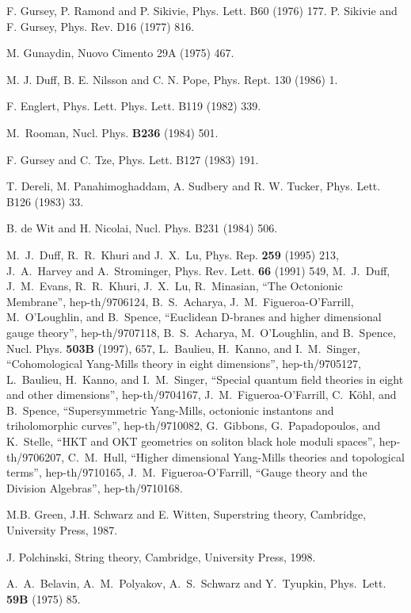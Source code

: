 \documentclass[a4paper,12pt]{book}
\begin{document}
\begin{thebibliography}{999}
  F. Gursey, P. Ramond and P. Sikivie, Phys. Lett. B60 (1976)
177. \newline
P. Sikivie and F. Gursey, Phys. Rev. D16 (1977) 816.

  M. Gunaydin, Nuovo Cimento 29A (1975) 467.

  M. J. Duff, B. E. Nilsson and C. N. Pope, Phys. Rept.
130 (1986) 1.

  F. Englert, Phys. Lett. Phys. Lett. B119 (1982) 339.

  M.~Rooman, Nucl. Phys. \textbf{B236} (1984) 501.

  F. Gursey and C. Tze, Phys. Lett. B127 (1983) 191.

  T. Dereli, M. Panahimoghaddam, A. Sudbery and R. W.
Tucker, Phys. Lett. B126 (1983) 33.

  B. de Wit and H. Nicolai, Nucl. Phys. B231 (1984) 506.

  M.~J.~Duff, R.~R.~Khuri and J.~X.~Lu, Phys. Rep. \textbf{259}
(1995) 213, J.~A.~Harvey and A.~Strominger, Phys. Rev. Lett. \textbf{66}
(1991) 549, M.~J.~Duff, J.~M.~Evans, R.~R.~Khuri, J.~X.~Lu, R.~Minasian,
``The Octonionic Membrane'', hep-th/9706124, B.~S.~Acharya,
J.~M.~Figueroa-O'Farrill, M.~O'Loughlin, and B.~Spence, ``Euclidean D-branes
and higher dimensional gauge theory'', hep-th/9707118, B.~S.~Acharya,
M.~O'Loughlin, and B.~Spence, Nucl. Phys. \textbf{503B} (1997), 657,
L.~Baulieu, H.~Kanno, and I.~M.~Singer, ``Cohomological Yang-Mills theory in
eight dimensions'', hep-th/9705127, L.~Baulieu, H.~Kanno, and I.~M.~Singer,
``Special quantum field theories in eight and other dimensions'',
hep-th/9704167, J.~M.~Figueroa-O'Farrill, C.~K{\"{o}}hl, and B.~Spence,
``Supersymmetric Yang-Mills, octonionic instantons and triholomorphic
curves'', hep-th/9710082, G.~Gibbons, G.~Papadopoulos, and K.~Stelle, ``HKT
and OKT geometries on soliton black hole moduli spaces'', hep-th/9706207,
C.~M.~Hull, ``Higher dimensional Yang-Mills theories and topological
terms'', hep-th/9710165, J.~M.~Figueroa-O'Farrill, ``Gauge theory and the
Division Algebras'', hep-th/9710168.

  M.B. Green, J.H. Schwarz and E. Witten, Superstring theory,
Cambridge, University Press, 1987.

  J. Polchinski, String theory, Cambridge, University Press,
1998.

  A.~A.~Belavin, A.~M.~Polyakov, A.~S.~Schwarz and Y.~Tyupkin,
Phys.~Lett. \textbf{59B} (1975) 85.


\end{thebibliography}
\end{document}
